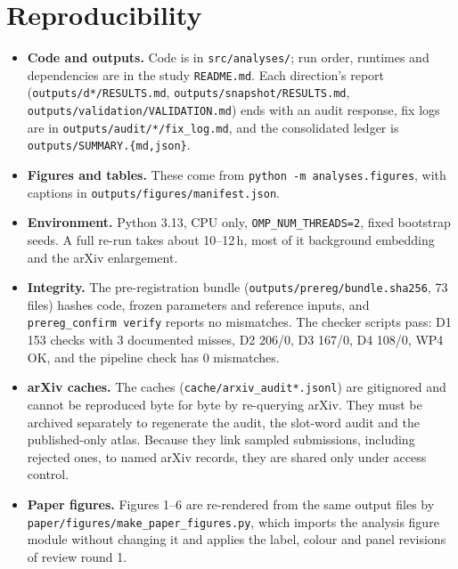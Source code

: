 \section{Reproducibility}
\label{app:nt-repro}

\begin{itemize}
\item \textbf{Code and outputs.} Code is in \texttt{src/analyses/}; run order, runtimes and dependencies are in the study \texttt{README.md}. Each direction's report (\texttt{outputs/d*/RESULTS.md}, \texttt{outputs/snapshot/RESULTS.md}, \texttt{outputs/validation/VALIDATION.md}) ends with an audit response, fix logs are in \texttt{outputs/audit/*/fix\_log.md}, and the consolidated ledger is \texttt{outputs/SUMMARY.\{md,json\}}.
\item \textbf{Figures and tables.} These come from \texttt{python -m analyses.figures}, with captions in \texttt{outputs/figures/manifest.json}.
\item \textbf{Environment.} Python 3.13, CPU only, \texttt{OMP\_NUM\_THREADS=2}, fixed bootstrap seeds. A full re-run takes about 10--12\,h, most of it background embedding and the arXiv enlargement.
\item \textbf{Integrity.} The pre-registration bundle (\texttt{outputs/prereg/bundle.sha256}, 73 files) hashes code, frozen parameters and reference inputs, and \texttt{prereg\_confirm verify} reports no mismatches. The checker scripts pass: D1 153 checks with 3 documented misses, D2 206/0, D3 167/0, D4 108/0, WP4 OK, and the pipeline check has 0 mismatches.
\item \textbf{arXiv caches.} The caches (\texttt{cache/arxiv\_audit*.jsonl}) are gitignored and cannot be reproduced byte for byte by re-querying arXiv. They must be archived separately to regenerate the audit, the slot-word audit and the published-only atlas. Because they link sampled submissions, including rejected ones, to named arXiv records, they are shared only under access control.
\item \textbf{Paper figures.} Figures 1--6 are re-rendered from the same output files by \texttt{paper/figures/make\_paper\_figures.py}, which imports the analysis figure module without changing it and applies the label, colour and panel revisions of review round 1.
\end{itemize}
